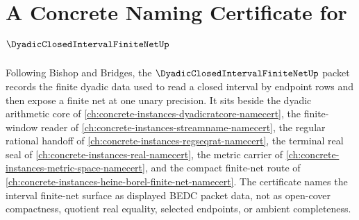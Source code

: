 \chapter{A Concrete Naming Certificate for $\DyadicClosedIntervalFiniteNetUp$}
\label{ch:concrete-instances-dyadic-closed-interval-finite-net-namecert}

Following Bishop and Bridges, the $\DyadicClosedIntervalFiniteNetUp$ packet records the finite dyadic data used to read a closed interval by endpoint rows and then expose a finite net at one unary precision. It sits beside the dyadic arithmetic core of \autoref{ch:concrete-instances-dyadicratcore-namecert}, the finite-window reader of \autoref{ch:concrete-instances-streamname-namecert}, the regular rational handoff of \autoref{ch:concrete-instances-regseqrat-namecert}, the terminal real seal of \autoref{ch:concrete-instances-real-namecert}, the metric carrier of \autoref{ch:concrete-instances-metric-space-namecert}, and the compact finite-net route of \autoref{ch:concrete-instances-heine-borel-finite-net-namecert}. The certificate names the interval finite-net surface as displayed BEDC packet data, not as open-cover compactness, quotient real equality, selected endpoints, or ambient completeness.


